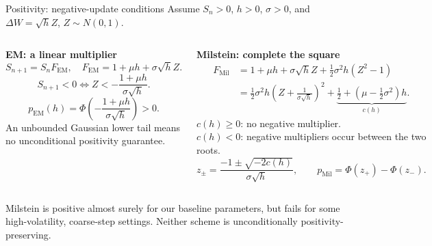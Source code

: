 \documentclass[aspectratio=169,11pt]{beamer}
\begin{document}
\begin{frame}{Positivity: negative-update conditions}
\scriptsize
\setlength{\abovedisplayskip}{4pt}
\setlength{\belowdisplayskip}{4pt}
Assume $S_n>0$, $h>0$, $\sigma>0$, and $\Delta W=\sqrt h Z$, $Z\sim N(0,1)$.
\begin{columns}[T,onlytextwidth]
\textbf{EM: a linear multiplier}
\[
 S_{n+1}=S_nF_{\mathrm{EM}},\quad
 F_{\mathrm{EM}}=1+\mu h+\sigma\sqrt h Z.
\]
\[
 S_{n+1}<0\iff
 Z<-\frac{1+\mu h}{\sigma\sqrt h}.
\]
\[
 p_{\mathrm{EM}}(h)=\Phi\!\left(-\frac{1+\mu h}{\sigma\sqrt h}\right)>0.
\]
An unbounded Gaussian lower tail means no unconditional positivity guarantee.

\textbf{Milstein: complete the square}
\begin{align*}
 F_{\mathrm{Mil}}&=1+\mu h+\sigma\sqrt h Z
 +\tfrac12\sigma^2h(Z^2-1)\\
 &=\tfrac12\sigma^2h\left(Z+\frac1{\sigma\sqrt h}\right)^2
 +\underbrace{\tfrac12+(\mu-\tfrac12\sigma^2)h}_{c(h)}.
\end{align*}
$c(h)\ge0$: no negative multiplier.\\
$c(h)<0$: negative multipliers occur between the two roots.
\[
 z_\pm=\frac{-1\pm\sqrt{-2c(h)}}{\sigma\sqrt h},\qquad
 p_{\mathrm{Mil}}=\Phi(z_+)-\Phi(z_-).
\]
\end{columns}
\medskip
Milstein is positive almost surely for our baseline parameters, but fails for
some high-volatility, coarse-step settings. Neither scheme is unconditionally positivity-preserving.
\end{frame}
\end{document}
